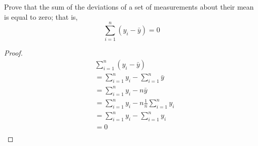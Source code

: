 \documentclass[10pt]{article}
\newenvironment{problem}[2][Problem]{\begin{trivlist}
		\item[\hskip \labelsep {\bfseries #1}\hskip \labelsep {\bfseries #2.}]}{\end{trivlist}}
\begin{document}
	
	
	\vspace{0.25in} %
	
	\begin{problem}{1.22}
		Prove that the sum of the deviations of a set of measurements about their mean is equal to zero; that is, \newline
		$$ \sum_{i=1}^{n}(y_{i} - \bar y) = 0 $$
		
	\end{problem}
	
\begin{proof}
\begin{equation}\nonumber
\begin{split}
 & \sum_{i=1}^{n}(y_{i} - \bar y)\\
 & = \sum_{i=1}^{n} y_i - \sum_{i=1}^{n}\bar y \\
 & = \sum_{i=1}^{n} y_i - {n}\bar y\\
  & = \sum_{i=1}^{n} y_i - {n} \frac{1}{n}\sum_{i=1}^{n} y_i \\
    & = \sum_{i=1}^{n} y_i - \sum_{i=1}^{n} y_i \\
 & = 0\\
\end{split}
\end{equation}

\end{proof}
	
\end{document}
